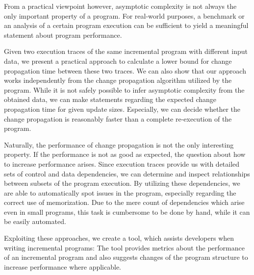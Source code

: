From a practical viewpoint however, asymptotic complexity is not always the only important property of a program. For real-world purposes, a benchmark or an analysis of a certain program execution can be sufficient to yield a meaningful statement about program performance. 

Given two execution traces of the same incremental program with different input data, we present a practical approach to calculate a lower bound for change propagation time between these two traces. We can also show that our approach works independently from the change propagation algorithm utilized by the program. While it is not safely possible to infer asymptotic complexity from the obtained data, we can make statements regarding the expected change propagation time for given update sizes. Especially, we can decide whether the change propagation is reasonably faster than a complete re-execution of the program. 

Naturally, the performance of change propagation is not the only interesting property. If the performance is not as good as expected, the question about how to increase performance arises. Since execution traces provide us with detailed sets of control and data dependencies, we can determine and inspect relationships between subsets of the program execution. By utilizing these dependencies, we are able to automatically spot issues in the program, especially regarding the correct use of memorization. Due to the mere count of dependencies which arise even in small programs, this task is cumbersome to be done by hand, while it can be easily automated. 

Exploiting these approaches, we create a tool, which assists developers when writing incremental programs: The tool provides metrics about the performance of an incremental program and also suggests changes of the program structure to increase performance where applicable. 